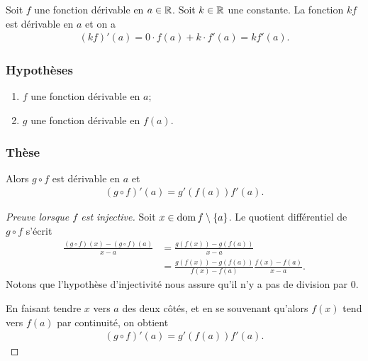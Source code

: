 \documentclass[main.tex]{subfiles}
\begin{document}
\begin{example}
    [Dérivée de $k f(x)$]
    Soit $f$ une fonction dérivable en $a \in \mathbb{R}$.
    Soit $k \in \mathbb{R}$ une constante. 
    La fonction $kf$ est dérivable en $a$ et on a 
    \begin{align}
        (kf)'(a) = 0 \cdot f(a) + k \cdot f'(a) = kf'(a).
    \end{align}
\end{example}

\begin{proposition}

    \subsubsection{Hypothèses}

    \begin{enumerate}
        \item $f$ une fonction dérivable en $a$;
        \item $g$ une fonction dérivable en $f(a)$.
    \end{enumerate}

    \subsubsection{Thèse}

    Alors $g \circ f$ est dérivable en $a$ et
    \begin{align}
        (g \circ f)'(a) = g'(f(a)) f'(a).
    \end{align}
\end{proposition}
\begin{proof}[Preuve lorsque $f$ est injective]
    Soit $x \in \operatorname{dom} f \setminus \{a\}$.
    Le quotient différentiel de $g \circ f$ s'écrit
    \begin{align}
        \frac {(g \circ f)(x) - (g \circ f)(a)} {x - a}
        &= \frac {g(f(x)) - g(f(a))} {x - a}\\
        &= \frac {g(f(x)) - g(f(a))} {f(x) - f(a)} \frac {f(x) - f(a)} {x - a}.
    \end{align}
    Notons que l'hypothèse d'injectivité nous assure qu'il n'y a pas de division par $0$.

    En faisant tendre $x$ vers $a$ des deux côtés,
    et en se souvenant qu'alors $f(x)$ tend vers $f(a)$ par continuité,
    on obtient
    \begin{align}
        (g \circ f)'(a) = g'(f(a)) f'(a).
    \end{align}
\end{proof}
\end{document}
